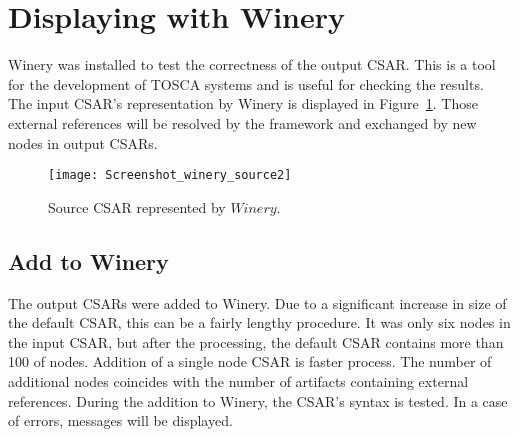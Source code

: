 \section{Displaying with Winery}\label{sec:checkwin}
Winery was installed to test the correctness of the output CSAR. 
 This is a tool for the development of TOSCA systems and is useful for checking the results. %
 The input CSAR's representation by Winery is displayed in Figure~\ref{fig:winery_source2}.
 Those external references will be resolved by the framework and exchanged by new nodes in output CSARs. 
 \begin{figure}[ht]   
 	\centering
 	\texttt{[image: Screenshot\_winery\_source2]}
 	\caption{Source CSAR represented by $Winery$.}
 	\label{fig:winery_source2}
 \end{figure}
   
 \subsection*{Add to Winery}
 The output CSARs were added to Winery.
 Due to a significant increase in size of the default CSAR, this can be a fairly lengthy procedure.
 It was only six nodes in the input CSAR, but after the processing, the default CSAR contains more than 100 of nodes.
 Addition of a single node CSAR is faster process.
 The number of additional nodes coincides with the number of artifacts containing external references.
 During the addition to Winery, the CSAR's syntax is tested.
 In a case of errors, messages will be displayed.
 
